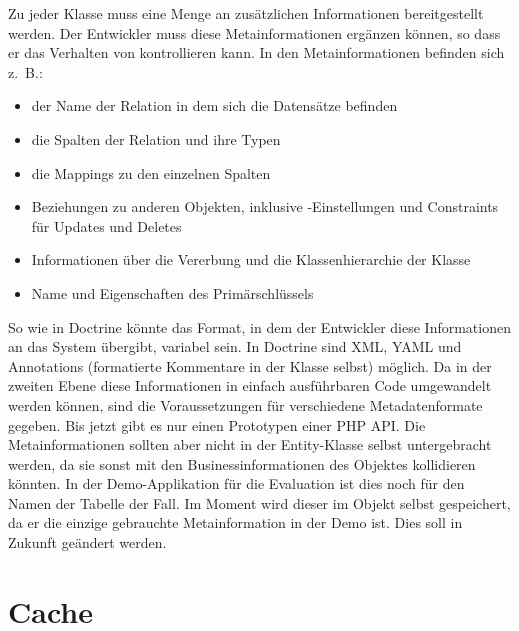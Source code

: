 Zu jeder Klasse muss eine Menge an zusätzlichen Informationen bereitgestellt werden. Der Entwickler muss diese Metainformationen ergänzen können, so dass er das Verhalten von \PSCORM kontrollieren kann. In den Metainformationen befinden sich z.~B.:
\begin{itemize}
\item der Name der Relation in dem sich die Datensätze befinden
\item die Spalten der Relation und ihre Typen
\item die Mappings zu den einzelnen Spalten
\item Beziehungen zu anderen Objekten, inklusive -Einstellungen und Constraints für Updates und Deletes
\item Informationen über die Vererbung und die Klassenhierarchie der Klasse
\item Name und Eigenschaften des Primärschlüssels
\end{itemize}
So wie in Doctrine könnte das Format, in dem der Entwickler diese Informationen an das System übergibt, variabel sein. In Doctrine sind XML, YAML und Annotations (formatierte Kommentare in der Klasse selbst) möglich. Da in der zweiten Ebene diese Informationen in einfach ausführbaren Code umgewandelt werden können, sind die Voraussetzungen für verschiedene Metadatenformate gegeben. Bis jetzt gibt es nur einen Prototypen einer PHP API. Die Metainformationen sollten aber nicht in der Entity-Klasse selbst untergebracht werden, da sie sonst mit den Businessinformationen des Objektes kollidieren könnten. In der Demo-Applikation für die Evaluation ist dies noch für den Namen der Tabelle der Fall. Im Moment wird dieser im Objekt selbst gespeichert, da er die einzige gebrauchte Metainformation in der Demo ist. Dies soll in Zukunft geändert werden. 

\section{Cache} \label{konzept-cache}

